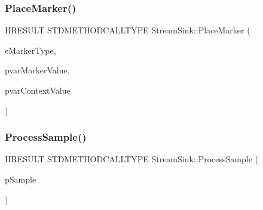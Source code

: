 \mbox{\label{class_stream_sink_ab8273c7f471918ba79d7033e132214ea}} 
\subsubsection{\texorpdfstring{Place\+Marker()}{PlaceMarker()}}
{\footnotesize\ttfamily H\+R\+E\+S\+U\+LT S\+T\+D\+M\+E\+T\+H\+O\+D\+C\+A\+L\+L\+T\+Y\+PE Stream\+Sink\+::\+Place\+Marker (\begin{DoxyParamCaption}\item[{M\+F\+S\+T\+R\+E\+A\+M\+S\+I\+N\+K\+\_\+\+M\+A\+R\+K\+E\+R\+\_\+\+T\+Y\+PE}]{e\+Marker\+Type,  }\item[{\+\_\+\+\_\+\+R\+P\+C\+\_\+\+\_\+in const P\+R\+O\+P\+V\+A\+R\+I\+A\+NT $\ast$}]{pvar\+Marker\+Value,  }\item[{\+\_\+\+\_\+\+R\+P\+C\+\_\+\+\_\+in const P\+R\+O\+P\+V\+A\+R\+I\+A\+NT $\ast$}]{pvar\+Context\+Value }\end{DoxyParamCaption})\hspace{0.3cm}{\ttfamily [inline]}}

\mbox{\label{class_stream_sink_a64ae241ae6b96fb3fd80edb6d02474ec}} 
\subsubsection{\texorpdfstring{Process\+Sample()}{ProcessSample()}}
{\footnotesize\ttfamily H\+R\+E\+S\+U\+LT S\+T\+D\+M\+E\+T\+H\+O\+D\+C\+A\+L\+L\+T\+Y\+PE Stream\+Sink\+::\+Process\+Sample (\begin{DoxyParamCaption}\item[{I\+M\+F\+Sample $\ast$}]{p\+Sample }\end{DoxyParamCaption})\hspace{0.3cm}{\ttfamily [inline]}}

\mbox{\label{class_stream_sink_ad557abea159d8b053902ef8d8501db3e}} 
